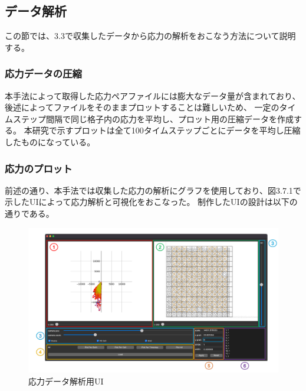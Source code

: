 \documentclass[12pt]{ltjsarticle}
\begin{document}
\subsection{データ解析}
この節では、3.3で収集したデータから応力の解析をおこなう方法について説明する。

\subsubsection{応力データの圧縮}
本手法によって取得した応力ペアファイルには膨大なデータ量が含まれており、後述によってファイルをそのままプロットすることは難しいため、
一定のタイムステップ間隔で同じ格子内の応力を平均し、プロット用の圧縮データを作成する。
本研究で示すプロットは全て100タイムステップごとにデータを平均し圧縮したものになっている。

\subsubsection{応力のプロット}
前述の通り、本手法では収集した応力の解析にグラフを使用しており、図3.7.1で示したUIによって応力解析と可視化をおこなった。
制作したUIの設計は以下の通りである。
\begin{figure}[htbp]
  \begin{center}
  \includegraphics*[scale=0.8]{UI.png}
  \end{center}
\caption{応力データ解析用UI}
\end{figure}
\end{document}
